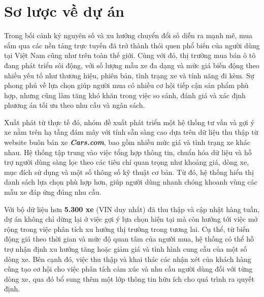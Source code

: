 \setlength{\parskip}{2pt}
\linespread{1}

\section{Sơ lược về dự án}

Trong bối cảnh kỷ nguyên số và xu hướng chuyển đổi số diễn ra mạnh mẽ, mua sắm qua các nền tảng trực tuyến đã trở thành thói quen phổ biến của người dùng tại Việt Nam cũng như trên toàn thế giới. Cùng với đó, thị trường mua bán ô tô đang phát triển sôi động, với số lượng mẫu xe đa dạng và mức giá biến động theo nhiều yếu tố như thương hiệu, phiên bản, tình trạng xe và tính năng đi kèm. Sự phong phú về lựa chọn giúp người mua có nhiều cơ hội tiếp cận sản phẩm phù hợp, nhưng cũng làm tăng khó khăn trong việc so sánh, đánh giá và xác định phương án tối ưu theo nhu cầu và ngân sách.

Xuất phát từ thực tế đó, nhóm đề xuất phát triển một hệ thống tư vấn và gợi ý xe nằm trên hạ tầng đám mây với tính sẵn sàng cao dựa trên dữ liệu thu thập từ website buôn bán xe \textbf{\textit{Cars.com}}, bao gồm nhiều mức giá và tình trạng xe khác nhau. Hệ thống tập trung vào việc tổng hợp thông tin, chuẩn hóa dữ liệu và hỗ trợ người dùng sàng lọc theo các tiêu chí quan trọng như khoảng giá, dòng xe, mục đích sử dụng và một số thông số kỹ thuật cơ bản. Từ đó, hệ thống hiển thị danh sách lựa chọn phù hợp hơn, giúp người dùng nhanh chóng khoanh vùng các mẫu xe đáp ứng đúng nhu cầu.

Với bộ dữ liệu hơn \textbf{5.300 xe} (VIN duy nhất) đã thu thập và cập nhật hàng tuần, dự án không chỉ dừng lại ở việc gợi ý lựa chọn hiện tại mà còn hướng tới việc mở rộng trong việc phân tích xu hướng thị trường trong tương lai. Cụ thể, từ biến động giá theo thời gian và mức độ quan tâm của người mua, hệ thống có thể hỗ trợ nhận định xu hướng tăng hoặc giảm giá và tình hình cung cầu của một số dòng xe. Bên cạnh đó, việc thu thập và khai thác các nhận xét của khách hàng cũng tạo cơ hội cho việc phân tích cảm xúc và nhu cầu người dùng đối với từng dòng xe, qua đó bổ sung thêm một lớp thông tin hữu ích cho quá trình ra quyết định.

